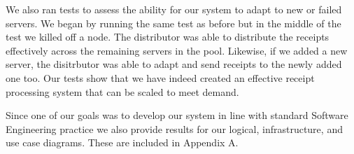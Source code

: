 We also ran tests to assess the ability for our system to adapt to new
or failed servers. We began by running the same test as before but in
the middle of the test we killed off a node. The distributor was able
to distribute the receipts effectively across the remaining servers in
the pool. Likewise, if we added a new server, the disitrbutor was able
to adapt and send receipts to the newly added one too. Our tests show
that we have indeed created an effective receipt processing system
that can be scaled to meet demand.

Since one of our goals was to develop our system in line with standard
Software Engineering practice we also provide results for our logical,
infrastructure, and use case diagrams. These are included in Appendix
A.
